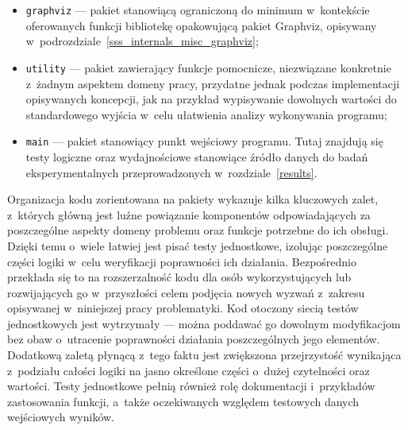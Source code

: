 {\begin{itemize}
    \item \texttt{graphviz} --- pakiet stanowiącą ograniczoną do minimum w~kontekście oferowanych funkcji bibliotekę opakowującą pakiet Graphviz, opisywany w~podrozdziale~\ref{sss_internals_misc_graphviz};
    \item \texttt{utility} --- pakiet zawierający funkcje pomocnicze, niezwiązane konkretnie z~żadnym aspektem domeny pracy, przydatne jednak podczas implementacji opisywanych koncepcji, jak na przykład wypisywanie dowolnych wartości do standardowego wyjścia w~celu ułatwienia analizy wykonywania programu;
    \item \texttt{main} --- pakiet stanowiący punkt wejściowy programu. Tutaj znajdują się testy logiczne oraz wydajnościowe stanowiące źródło danych do badań eksperymentalnych przeprowadzonych w~rozdziale~\ref{results}.
  \end{itemize}
}
\par{
  Organizacja kodu zorientowana na pakiety wykazuje kilka kluczowych zalet, z~których główną jest luźne powiązanie komponentów odpowiadających za poszczególne aspekty domeny problemu oraz funkcje potrzebne do ich obsługi.
  Dzięki temu o~wiele łatwiej jest pisać testy jednostkowe, izolując poszczególne części logiki w~celu weryfikacji poprawności ich działania. 
  Bezpośrednio przekłada się to na rozszerzalność kodu dla osób wykorzystujących lub rozwijających go w~przyszłości celem podjęcia nowych wyzwań z~zakresu opisywanej w~niniejszej pracy problematyki.
  Kod otoczony siecią testów jednostkowych jest wytrzymały --- można poddawać go dowolnym modyfikacjom bez obaw o~utracenie poprawności działania poszczególnych jego elementów.
  Dodatkową zaletą płynącą z~tego faktu jest zwiększona przejrzystość wynikająca z~podziału całości logiki na jasno określone części o~dużej czytelności oraz wartości.
  Testy jednostkowe pełnią również rolę dokumentacji i~przykładów zastosowania funkcji, a~także oczekiwanych względem testowych danych wejściowych wyników.
}